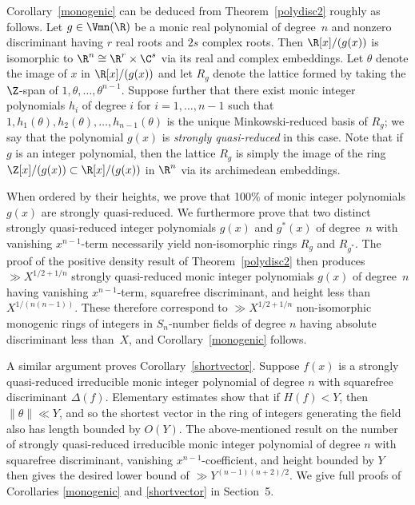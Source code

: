 Corollary~\ref{monogenic} can be deduced from
Theorem~\ref{polydisc2} roughly as follows. Let $g\in \Vmn(\R)$ be
a monic real polynomial of degree~$n$ and nonzero discriminant having
$r$ real roots and $2s$ complex roots.  Then $\R[x]/(g(x))$ is
isomorphic to $\R^n\cong \R^r\times \C^s$ via its real and complex
embeddings.  Let $\theta$ denote the image of $x$ in $\R[x]/(g(x))$
and let $R_g$ denote the lattice formed by taking the $\Z$-span of
$1,\theta,\ldots,\theta^{n-1}$. Suppose further that there exist
monic integer polynomials $h_i$ of degree $i$ for $i=1,\ldots,n-1$
such that $1,h_1(\theta),h_2(\theta),\ldots,h_{n-1}(\theta)$ is the
unique Minkowski-reduced basis of $R_g$; we say that the polynomial
$g(x)$ is {\it strongly quasi-reduced} in this case. Note that if $g$
is an integer polynomial, then the lattice $R_g$ is simply the image
of the ring $\Z[x]/(g(x))\subset \R[x]/(g(x))$ in $\R^n$ via its
archimedean embeddings.

  When ordered by their heights, we prove that 100\% of monic integer
  polynomials $g(x)$ are strongly quasi-reduced. We furthermore prove
  that two distinct strongly quasi-reduced integer polynomials $g(x)$
  and $g^\ast(x)$ of degree~$n$ with vanishing $x^{n-1}$-term
  necessarily yield non-isomorphic rings $R_g$ and $R_{g^\ast}$.  The
  proof of the positive density result of Theorem~\ref{polydisc2} then
  produces $\gg X^{1/2+1/n}$ strongly quasi-reduced monic integer
  polynomials $g(x)$ of degree~$n$ having vanishing $x^{n-1}$-term,
  squarefree discriminant, and height less than $X^{1/(n(n-1))}$.
  These therefore correspond to $\gg X^{1/2+1/n}$ non-isomorphic
  monogenic rings of integers in $S_n$-number fields of degree $n$
  having absolute discriminant less than~$X$, and
  Corollary~\ref{monogenic} follows.

A similar argument proves Corollary~\ref{shortvector}. Suppose $f(x)$
is a strongly quasi-reduced irreducible monic integer polynomial of
degree $n$ with squarefree discriminant $\Delta(f)$.  Elementary
estimates show that if $H(f)<Y$, then $\|\theta\|\ll Y$, and so the
shortest vector in the ring of integers generating the field also has
length bounded by $O(Y)$. The above-mentioned result on the number of
strongly quasi-reduced irreducible monic integer polynomial of degree
$n$ with squarefree discriminant, vanishing $x^{n-1}$-coefficient, and
height bounded by $Y$ then gives the desired lower bound of
$\gg Y^{(n-1)(n+2)/2}.$ We give full proofs of Corollaries \ref{monogenic} and
\ref{shortvector} in Section~5.

